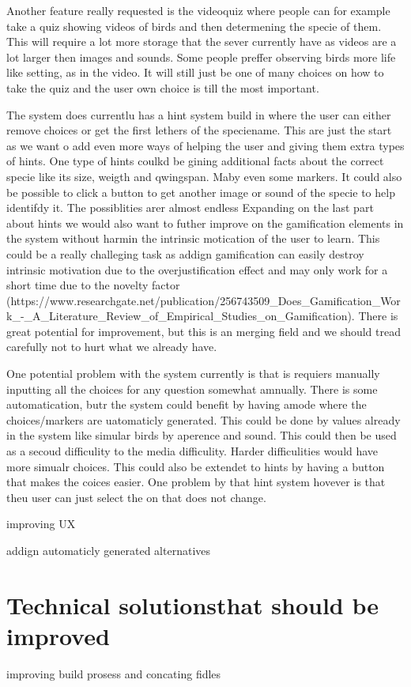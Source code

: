 Another feature really requested is the videoquiz where people can for example take a quiz showing videos of birds and then determening the specie of them. This will require a lot more storage that the sever currently have as videos are a lot larger then images and sounds. Some people preffer observing birds more life like setting, as in the video. It will still just be one of many choices on how to take the quiz and the user own choice is till the most important.

The system does currentlu has a hint system build in where the user can either remove choices or get the first lethers of the speciename. This are just the start as we want o add even more ways of helping the user and giving them extra types of hints. One type of hints coulkd be gining additional facts about the correct  specie like its size, weigth and qwingspan. Maby even some markers. It could also be possible to click a button to get another image or sound of the specie to help identifdy it. The possiblities arer almost endless 
Expanding on the last part about hints we would also want to futher improve on the gamification elements in the system without harmin the intrinsic motication of the user to learn. This could be a really challeging task as addign gamification can easily destroy intrinsic motivation due to the overjustification effect and may only work for a short time due to the novelty factor (https://www.researchgate.net/publication/256743509_Does_Gamification_Work_-_A_Literature_Review_of_Empirical_Studies_on_Gamification). There is great potential for improvement, but this is an merging field and we should tread carefully not to hurt what we already have. 

One potential problem with the system currently is that is requiers manually inputting all the choices for any question somewhat amnually. There is some automatication, butr the system could benefit by having amode where the choices/markers are uatomaticly generated. This could be done by values already in the system like simular birds by aperence and sound. This could then  be used as a secoud difficulity to the media difficulity. Harder difficulities would have more simualr choices. This could also be extendet to hints by having a button that makes the coices easier. One problem by that hint system hovever is that theu user can just select the on that does not change.

improving UX



addign automaticly generated alternatives






\section{Technical solutionsthat should be improved}

improving build prosess and concating fidles

